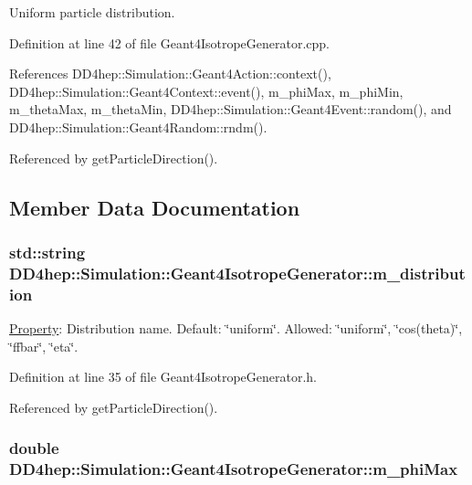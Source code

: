 Uniform particle distribution. 

Definition at line 42 of file Geant4IsotropeGenerator.cpp.

References DD4hep::Simulation::Geant4Action::context(), DD4hep::Simulation::Geant4Context::event(), m\_\-phiMax, m\_\-phiMin, m\_\-thetaMax, m\_\-thetaMin, DD4hep::Simulation::Geant4Event::random(), and DD4hep::Simulation::Geant4Random::rndm().

Referenced by getParticleDirection().

\subsection{Member Data Documentation}
\hypertarget{class_d_d4hep_1_1_simulation_1_1_geant4_isotrope_generator_a06a94fc1f4b02b112f0b56ced43b2f6b}{
\subsubsection[{m\_\-distribution}]{\setlength{\rightskip}{0pt plus 5cm}std::string {\bf DD4hep::Simulation::Geant4IsotropeGenerator::m\_\-distribution}}}
\label{class_d_d4hep_1_1_simulation_1_1_geant4_isotrope_generator_a06a94fc1f4b02b112f0b56ced43b2f6b}


\hyperlink{class_d_d4hep_1_1_property}{Property}: Distribution name. Default: \char`\"{}uniform\char`\"{}. Allowed: \char`\"{}uniform\char`\"{}, \char`\"{}cos(theta)\char`\"{}, \char`\"{}ffbar\char`\"{}, \char`\"{}eta\char`\"{}. 

Definition at line 35 of file Geant4IsotropeGenerator.h.

Referenced by getParticleDirection().\hypertarget{class_d_d4hep_1_1_simulation_1_1_geant4_isotrope_generator_a72d8e77fc0bb2c1160d2266c02fa82ef}{
\subsubsection[{m\_\-phiMax}]{\setlength{\rightskip}{0pt plus 5cm}double {\bf DD4hep::Simulation::Geant4IsotropeGenerator::m\_\-phiMax}}}
\label{class_d_d4hep_1_1_simulation_1_1_geant4_isotrope_generator_a72d8e77fc0bb2c1160d2266c02fa82ef}


